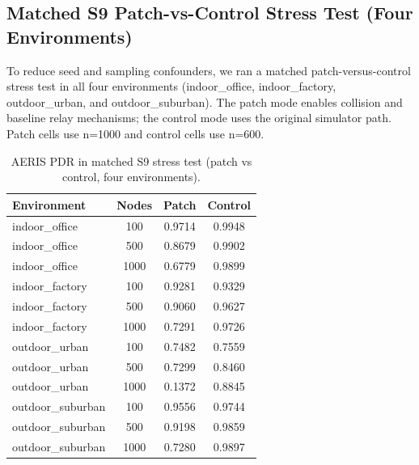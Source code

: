 ﻿\documentclass[sensors,article,submit,moreauthors,pdftex]{Definitions/mdpi}
\begin{document}
\subsection{Matched S9 Patch-vs-Control Stress Test (Four Environments)}
To reduce seed and sampling confounders, we ran a matched patch-versus-control stress test in all four environments (indoor\_office, indoor\_factory, outdoor\_urban, and outdoor\_suburban). The patch mode enables collision and baseline relay mechanisms; the control mode uses the original simulator path. Patch cells use n=1000 and control cells use n=600.

\begin{table}[H]
\caption{AERIS PDR in matched S9 stress test (patch vs control, four environments).}
\label{tab:s9_patch_control}
\centering
\begin{tabular}{lccc}
\toprule
Environment & Nodes & Patch & Control \\
\midrule
indoor\_office & 100  & 0.9714 & 0.9948 \\
indoor\_office & 500  & 0.8679 & 0.9902 \\
indoor\_office & 1000 & 0.6779 & 0.9899 \\
indoor\_factory & 100  & 0.9281 & 0.9329 \\
indoor\_factory & 500  & 0.9060 & 0.9627 \\
indoor\_factory & 1000 & 0.7291 & 0.9726 \\
outdoor\_urban & 100  & 0.7482 & 0.7559 \\
outdoor\_urban & 500  & 0.7299 & 0.8460 \\
outdoor\_urban & 1000 & 0.1372 & 0.8845 \\
outdoor\_suburban & 100  & 0.9556 & 0.9744 \\
outdoor\_suburban & 500  & 0.9198 & 0.9859 \\
outdoor\_suburban & 1000 & 0.7280 & 0.9897 \\
\bottomrule
\end{tabular}
\end{table}
\end{document}
